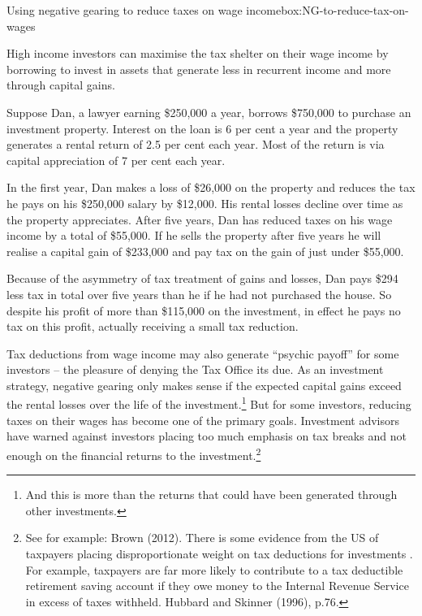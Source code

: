 \documentclass{grattan}\usepackage[]{graphicx}\usepackage[]{color}
\begin{document}
\begin{smallbox}{Using negative gearing to reduce taxes on wage income}{box:NG-to-reduce-tax-on-wages}

High income investors can maximise the tax shelter on their wage income
by borrowing to invest in assets that generate less in recurrent income
and more through capital gains.

Suppose Dan, a lawyer earning \$250,000 a year, borrows \$750,000 to
purchase an investment property. Interest on the loan is 6 per cent a
year and the property generates a rental return of 2.5 per cent each
year. Most of the return is via capital appreciation of 7 per cent each
year.

In the first year, Dan makes a loss of \$26,000 on the property and
reduces the tax he pays on his \$250,000 salary by \$12,000. His rental
losses decline over time as the property appreciates. After five years,
Dan has reduced taxes on his wage income by a total of \$55,000. If he
sells the property after five years he will realise a capital gain of
\$233,000 and pay tax on the gain of just under \$55,000.

Because of the asymmetry of tax treatment of gains and losses, Dan pays
\$294 less tax in total over five years than he if he had not purchased
the house. So despite his profit of more than \$115,000 on the
investment, in effect he pays no tax on this profit, actually receiving
a small tax reduction.
\end{smallbox}
Tax deductions from wage income may also generate ``psychic payoff'' for
some investors -- the pleasure of denying the Tax Office its due. As an
investment strategy, negative gearing only makes sense if the expected
capital gains exceed the rental losses over the life of the
investment.\footnote{And this is more than the returns that could have
  been generated through other investments.} But for some investors,
reducing taxes on their wages has become one of the primary goals.
Investment advisors have warned against investors placing too much
emphasis on tax breaks and not enough on the financial returns to the
investment.\footnote{See for example: Brown (2012). There is some
  evidence from the US of taxpayers placing disproportionate weight on
  tax deductions for investments . For example, taxpayers are far more
  likely to contribute to a tax deductible retirement saving account if
  they owe money to the Internal Revenue Service in excess of taxes
  withheld. Hubbard and Skinner (1996), p.76.}
  
\end{document}
